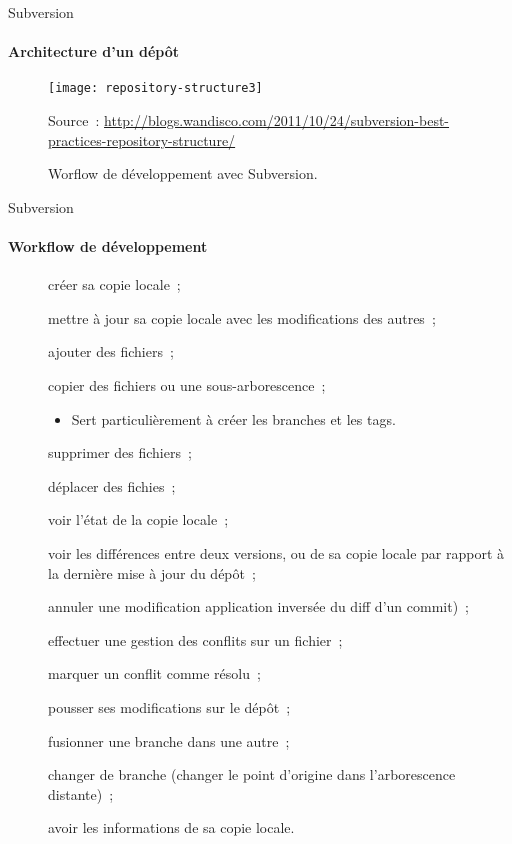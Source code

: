 \begin{frame}{Subversion}
\framesubtitle{Architecture d'un dépôt}
 \begin{figure}
   \caption{Worflow de développement avec Subversion.}
   \texttt{[image: repository-structure3]}\par
   \tiny Source~: \url{http://blogs.wandisco.com/2011/10/24/subversion-best-practices-repository-structure/}
 \end{figure}
\end{frame}

\begin{frame}{Subversion}
\framesubtitle{Workflow de développement}
\begin{description}
 \item [] créer sa copie locale~;
 \pause
 \item [] mettre à jour sa copie locale avec les modifications des autres~;
 \pause
 \item [] ajouter des fichiers~;
 \pause
 \item [] copier des fichiers ou une sous-arborescence~;
 \begin{itemize}
  \item Sert particulièrement à créer les branches et les tags.
 \end{itemize}
 \pause
 \item [] supprimer des fichiers~;
 \pause
 \item [] déplacer des fichies~;
 \pause
 \item [] voir l'état de la copie locale~;
 \pause
 \item [] voir les différences entre deux versions, ou de sa copie locale par rapport à la dernière mise à jour du dépôt~;
 \pause
 \item [] annuler une modification application inversée du diff d'un commit)~;
 \pause
 \item [] effectuer une gestion des conflits sur un fichier~;
 \pause
 \item [] marquer un conflit comme résolu~;
 \pause
 \item [] pousser ses modifications sur le dépôt~;
 \pause
 \item [] fusionner une branche dans une autre~;
 \pause
 \item [] changer de branche (changer le point d'origine dans l'arborescence distante)~;
 \pause
 \item [] avoir les informations de sa copie locale.
\end{description}
\end{frame}

